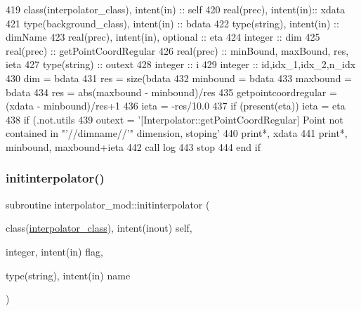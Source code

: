 \begin{DoxyCode}
419     \textcolor{keywordtype}{class}(interpolator\_class), \textcolor{keywordtype}{intent(in)} :: self
420     \textcolor{keywordtype}{real(prec)}, \textcolor{keywordtype}{intent(in)}:: xdata
421     \textcolor{keywordtype}{type}(background\_class), \textcolor{keywordtype}{intent(in)} :: bdata
422     \textcolor{keywordtype}{type}(string), \textcolor{keywordtype}{intent(in)} :: dimName
423     \textcolor{keywordtype}{real(prec)}, \textcolor{keywordtype}{intent(in)}, \textcolor{keywordtype}{optional} :: eta
424     \textcolor{keywordtype}{integer} :: dim
425     \textcolor{keywordtype}{real(prec)} :: getPointCoordRegular
426     \textcolor{keywordtype}{real(prec)} :: minBound, maxBound, res, ieta
427     \textcolor{keywordtype}{type}(string) :: outext
428     \textcolor{keywordtype}{integer} :: i
429     \textcolor{keywordtype}{integer} :: id,idx\_1,idx\_2,n\_idx
430     dim = bdata%
431     res = \textcolor{keyword}{size}(bdata%
432     minbound = bdata%
433     maxbound = bdata%
434     res = abs(maxbound - minbound)/res
435     getpointcoordregular = (xdata - minbound)/res+1
436     ieta = -res/10.0
437     \textcolor{keywordflow}{if} (\textcolor{keyword}{present}(eta)) ieta = eta
438     \textcolor{keywordflow}{if} (.not.utils%
439         outext = \textcolor{stringliteral}{'[Interpolator::getPointCoordRegular] Point not contained in "'}//dimname//\textcolor{stringliteral}{'" dimension,
       stoping'}
440         print*, xdata
441         print*, minbound, maxbound+ieta
442         \textcolor{keyword}{call }log%
443         stop
444 \textcolor{keywordflow}{    end if}
\end{DoxyCode}
\mbox{\label{namespaceinterpolator__mod_adcaf3bba800f19991ed4f33c968184e9}} 
\subsubsection{\texorpdfstring{initinterpolator()}{initinterpolator()}}
{\footnotesize\ttfamily subroutine interpolator\+\_\+mod\+::initinterpolator (\begin{DoxyParamCaption}\item[{class(\mbox{\hyperlink{structinterpolator__mod_1_1interpolator__class}{interpolator\+\_\+class}}), intent(inout)}]{self,  }\item[{integer, intent(in)}]{flag,  }\item[{type(string), intent(in)}]{name }\end{DoxyParamCaption})\hspace{0.3cm}{\ttfamily [private]}}



